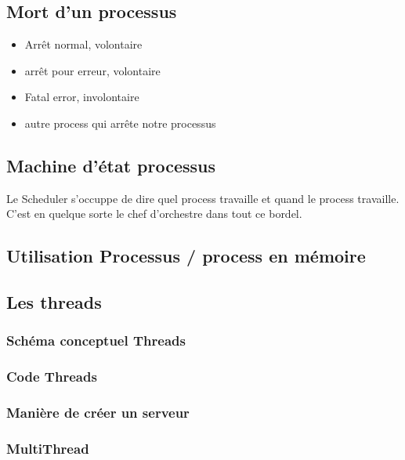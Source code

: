 \subsection{Mort d'un processus}
\begin{itemize}
    \item Arrêt normal, volontaire
    \item arrêt pour erreur, volontaire
    \item Fatal error, involontaire
    \item autre process qui arrête notre processus
\end{itemize}

\subsection{Machine d'état processus}
Le Scheduler s'occuppe de dire quel process travaille et quand le process travaille. C'est en quelque sorte le chef d'orchestre dans tout ce bordel.

\subsection{Utilisation Processus / process en mémoire}
\subsection{Les threads}

\subsubsection{Schéma conceptuel Threads}

\subsubsection{Code Threads}

\subsubsection{Manière de créer un serveur }

\subsubsection{MultiThread}

